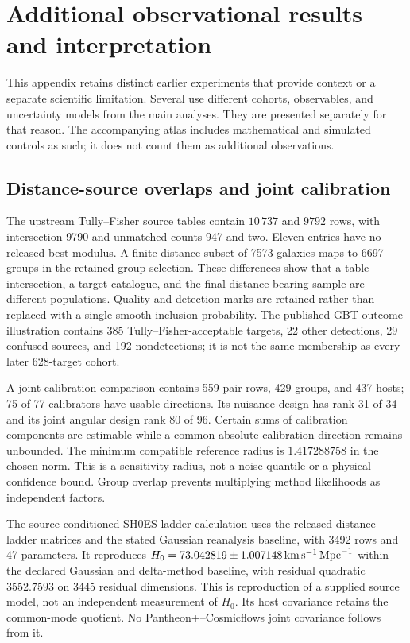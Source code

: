 \section{Additional observational results and interpretation}
\label{app:inventory}

This appendix retains distinct earlier experiments that provide context or a separate scientific limitation. Several use different cohorts, observables, and uncertainty models from the main analyses. They are presented separately for that reason. The accompanying atlas includes mathematical and simulated controls as such; it does not count them as additional observations.

\subsection{Distance-source overlaps and joint calibration}

The upstream Tully--Fisher source tables contain $10\,737$ and $9792$ rows, with intersection 9790 and unmatched counts 947 and two. Eleven entries have no released best modulus. A finite-distance subset of 7573 galaxies maps to 6697 groups in the retained group selection. These differences show that a table intersection, a target catalogue, and the final distance-bearing sample are different populations. Quality and detection marks are retained rather than replaced with a single smooth inclusion probability. The published GBT outcome illustration contains 385 Tully--Fisher-acceptable targets, 22 other detections, 29 confused sources, and 192 nondetections; it is not the same membership as every later 628-target cohort.

A joint calibration comparison contains 559 pair rows, 429 groups, and 437 hosts; 75 of 77 calibrators have usable directions. Its nuisance design has rank 31 of 34 and its joint angular design rank 80 of 96. Certain sums of calibration components are estimable while a common absolute calibration direction remains unbounded. The minimum compatible reference radius is $1.417288758$ in the chosen norm. This is a sensitivity radius, not a noise quantile or a physical confidence bound. Group overlap prevents multiplying method likelihoods as independent factors.

The source-conditioned SH0ES ladder calculation uses the released distance-ladder matrices and the stated Gaussian reanalysis baseline, with 3492 rows and 47 parameters.\cite{Riess2022,PerivolaropoulosSkara2022} It reproduces $H_0=73.042819\pm1.007148\,\mathrm{km}\,\mathrm{s}^{-1}\,\mathrm{Mpc}^{-1}$ within the declared Gaussian and delta-method baseline, with residual quadratic $3552.7593$ on 3445 residual dimensions. This is reproduction of a supplied source model, not an independent measurement of $H_0$. Its host covariance retains the common-mode quotient. No Pantheon+--Cosmicflows joint covariance follows from it.


